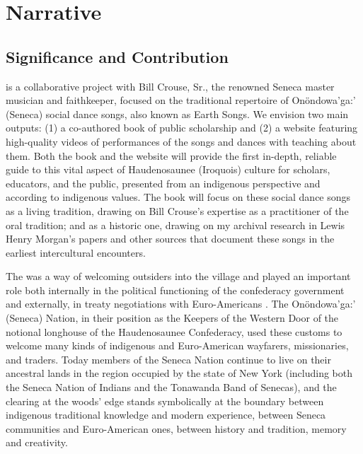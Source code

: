 \documentclass{neh}
\begin{document}
\section{Narrative}
\subsection{Significance and Contribution}

 is a
collaborative project with Bill Crouse, Sr., the renowned Seneca master
musician and faithkeeper, focused on the traditional repertoire of
Onöndowa'ga:' (Seneca) social dance songs, also known as Earth Songs.
We envision two main outputs: (1) a co-authored book of public scholarship and
(2) a website featuring high-quality videos of performances of the songs and
dances with teaching about them.
Both the book and the website will provide the first in-depth, reliable
guide to this vital aspect of Haudenosaunee (Iroquois) culture for scholars,
educators, and the public, presented from an indigenous perspective and
according to indigenous values.  
The book will focus on these social dance songs as a living tradition, drawing
on Bill Crouse’s expertise as a practitioner of the oral tradition; and as a
historic one, drawing on my archival research in Lewis Henry Morgan’s papers
and other sources that document these songs in the earliest intercultural
encounters. 

The  was a way of welcoming outsiders into
the village and played an important role both internally in the political
functioning of the confederacy government and externally, in treaty
negotiations with Euro-Americans
\Autocites{Richter:Ordeal}{Fenton:GreatLaw}.
The Onöndowa’ga:’ (Seneca) Nation, in their position as the Keepers of the
Western Door of the notional longhouse of the Haudenosaunee Confederacy,
used these customs to welcome many kinds of indigenous and Euro-American
wayfarers, missionaries, and traders.
Today members of the Seneca Nation continue to live on their ancestral lands
in the region occupied by the state of New York (including both the Seneca
Nation of Indians and the Tonawanda Band of Senecas), and the clearing at the
woods' edge stands symbolically at the boundary between indigenous traditional
knowledge and modern experience, between Seneca communities and Euro-American
ones, between history and tradition, memory and creativity.
\end{document}
